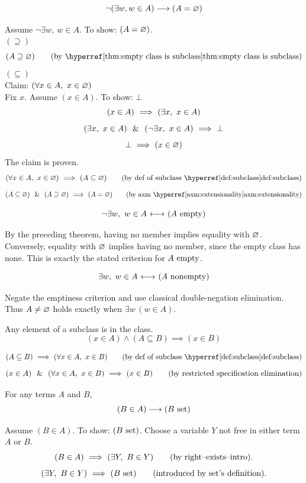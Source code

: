 \begin{theorem}
\[
\neg(\exists w, w\in A)
\longrightarrow
(A=\varnothing)
\]
\end{theorem}
\Proof
Assume $\neg\exists w,\  w\in A$. To show: $(A=\varnothing)$.\\
$(\supseteq)$
\[
(A\supseteq\emptyclass)
\tag{by \myref{thm:empty class is subclass}}
\]
$(\subseteq)$\\
Claim: $(\forall x\in A,\ x\in\emptyclass)$\\
Fix $x$. Assume $(x\in A)$. To show: $\bot$
\[
(x\in A)
\ \Longrightarrow\ 
(\exists x,\ x\in A)
\]
\[
(\exists x,\ x\in A)
\LAND
(\neg\exists x,\ x\in A)
\IMPLIES
\bot
\]
\[
\bot
\ \Longrightarrow\ 
(x\in\varnothing)
\]
The claim is proven.
\[
(\forall x\in A,\ x\in\emptyclass)
\IMPLIES
(A \subseteq \emptyclass)
\tag{by def of subclass \myref{def:subclass}}
\]
\[
(A \subseteq \emptyclass)
\LAND
(A \supseteq \emptyclass)
\IMPLIES
(A=\emptyclass)
\tag{by axm \myref{axm:extensionality}}
\]
\Done
\begin{theorem}
\[
\neg\exists w,\  w\in A
{\ \longleftrightarrow\ }
(A\mathrm{\ empty})
\]
\end{theorem}
\Proof
By the preceding theorem, having no member implies equality with
$\varnothing$. Conversely, equality with $\varnothing$ implies having
no member, since the empty class has none. This is exactly the stated
criterion for $A\mathrm{\ empty}$.
\Done
\begin{theorem}
\[
\exists w,\  w\in A
{\ \longleftrightarrow\ }
(A\mathrm{\ nonempty})
\]
\end{theorem}
\Proof
Negate the emptiness criterion and use classical double-negation
elimination. Thus $A\ne\varnothing$ holds exactly when
$\exists w\,(w\in A)$.
\Done

\begin{theorem}
Any element of a subclass is in the class.
\[
(x\in A)\land(A\subseteq B)\implies(x\in B)
\label{thm:element of subclass}
\]
\end{theorem}
\ProofNoPar
\[
(A\subseteq B)
\IMPLIES
(\forall x\in A,\ x\in B)
\tag{by def of subclass \myref{def:subclass}}
\]
\[
(x\in A)
\ \ \&\ \ 
(\forall x\in A,\ x\in B)
\ \Longrightarrow\ 
(x\in B)
\tag{by restricted specification elimination}
\]
\Done

\begin{theorem}
For any terms $A$ and $B$,
\[
(B\in A)
\longrightarrow
(B\mathrm{\ set})
\]
\label{thm:in class then set}
\end{theorem}
\Proof
Assume $(B\in A)$. To show: $(B\mathrm{\ set})$. Choose a variable $Y$
not free in either term $A$ or $B$.
\[
(B\in A)
\ \Longrightarrow\ 
(\exists Y,\  B\in Y)
\tag{by right--exists--intro}.
\]
\[
(\exists Y,\  B\in Y)
\ \Longrightarrow\ 
(B\mathrm{\ set})
\tag{introduced by set's definition}.
\]
\Done

